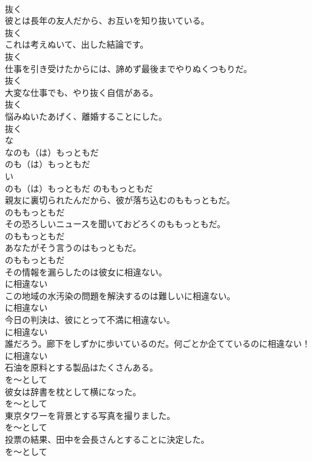 \documentclass[8pt]{extreport}
\begin{document}
\begin{CJK}{UTF8}{min}
\\	抜く
\\	彼とは長年の友人だから、お互いを知り抜いている。	
\\	抜く
\\	これは考えぬいて、出した結論です。	
\\	抜く
\\	仕事を引き受けたからには、諦めず最後までやりぬくつもりだ。	
\\	抜く
\\	大変な仕事でも、やり抜く自信がある。	
\\	抜く
\\	悩みぬいたあげく、離婚することにした。	
\\	抜く
\\	な
\\	なのも（は）もっともだ	
\\	のも（は）もっともだ	
\\	い
\\	のも（は）もっともだ	のももっともだ
\\	親友に裏切られたんだから、彼が落ち込むのももっともだ。	
\\	のももっともだ
\\	その恐ろしいニュースを聞いておどろくのももっともだ。	
\\	のももっともだ
\\	あなたがそう言うのはもっともだ。	
\\	のももっともだ
\\	その情報を漏らしたのは彼女に相違ない。	
\\	に相違ない
\\	この地域の水汚染の問題を解決するのは難しいに相違ない。	
\\	に相違ない
\\	今日の判決は、彼にとって不満に相違ない。	
\\	に相違ない
\\	誰だろう。廊下をしずかに歩いているのだ。何ごとか企てているのに相違ない！	
\\	に相違ない
\\	石油を原料とする製品はたくさんある。	
\\	を～として
\\	彼女は辞書を枕として横になった。	
\\	を～として
\\	東京タワーを背景とする写真を撮りました。	
\\	を～として
\\	投票の結果、田中を会長さんとすることに決定した。	
\\	を～として

\end{CJK}
\end{document}
